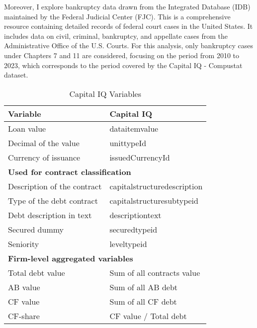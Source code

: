 \documentclass[12pt]{article}
\begin{document}
Moreover, I explore bankruptcy data drawn from the Integrated Database (IDB) maintained by the Federal Judicial Center (FJC). This is a comprehensive resource containing detailed records of federal court cases in the United States. It includes data on civil, criminal, bankruptcy, and appellate cases from the Administrative Office of the U.S. Courts. For this analysis, only bankruptcy cases under Chapters 7 and 11 are considered, focusing on the period from 2010 to 2023, which corresponds to the period covered by the Capital IQ - Compustat dataset. 

\begin{table}[htbp]    

    \centering
    \caption{Capital IQ Variables}
    \label{tab:CAPIQ}
    \begin{tabular}{ll}
    \toprule
    Variable & Capital IQ \\
    \midrule
    Loan value & dataitemvalue \\
    Decimal of the value & unittypeId \\
    Currency of issuance & issuedCurrencyId \vspace{3mm} \\
    \multicolumn{2}{l}{\textbf{Used for contract classification}} \\
    Description of the contract & capitalstructuredescription \\
    Type of the debt contract & capitalstructuresubtypeid \\
    Debt description in text & descriptiontext \\
    Secured dummy & securedtypeid \\
    Seniority & leveltypeid \vspace{3mm} \\
    \multicolumn{2}{l}{\textbf{Firm-level aggregated variables}} \\
    Total debt value & Sum of all contracts value \\
    AB value & Sum of all AB debt \\
    CF value & Sum of all CF debt \\
    CF-share & CF value / Total debt \\
    \bottomrule
    \end{tabular}
\end{table}
\end{document}

